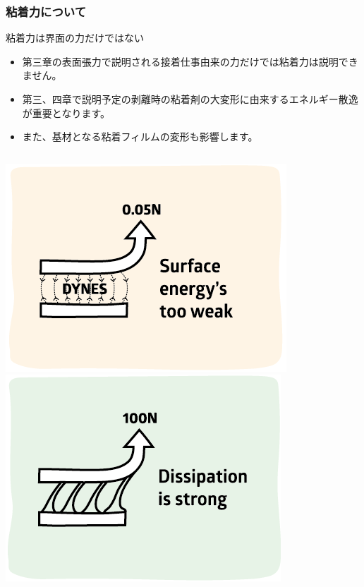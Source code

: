 \documentclass[unicode,12pt]{beamer}%
\begin{document}
\begin{frame}
	\frametitle{粘着力について}
	\begin{block}{粘着力は界面の力だけではない}
		\begin{itemize}
			\item 第三章の表面張力で説明される\alert{接着仕事由来の力だけでは粘着力は説明できません}。
			\item 第三、四章で説明予定の剥離時の粘着剤の\alert{大変形に由来するエネルギー散逸が重要}となります。
			\item また、基材となる粘着フィルムの変形も影響します。
		\end{itemize}
		\vspace{8mm}
		\begin{columns}[c, onlytextwidth]
			\centering
			\includegraphics[width=\textwidth]{SurfEnergy.png}
			\centering
			\includegraphics[width=\textwidth]{Dissipation.png}

\end{columns}
\end{block}
\end{frame}
\end{document}
